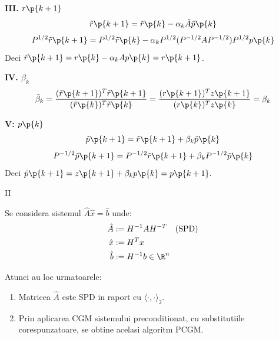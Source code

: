 \begin{demonstratie}
    \bigskip

    \textbf{III. $r\p{k + 1}$} \\
    $$ \tilde{r}\p{k+1} = \tilde{r}\p{k} - \alpha_k \tilde{A} \tilde{p}\p{k} $$
    $$ P^{1/2}\tilde{r}\p{k+1} = P^{1/2}\tilde{r}\p{k} - \alpha_k P^{1/2}(P^{-1/2} A P^{-1/2}) P^{1/2} p\p{k} $$
    Deci $ \tilde{r}\p{k+1} = r\p{k} - \alpha_k A p\p{k} = r\p{k + 1}$.

    \bigskip

    \textbf{IV. $\beta_k$} \\
    $$ \tilde{\beta}_k = \frac{(\tilde{r}\p{k+1})^T \tilde{r}\p{k+1}}{(\tilde{r}\p{k})^T \tilde{r}\p{k}} = \frac{(r\p{k+1})^T z\p{k+1}}{(r\p{k})^T z\p{k}} = \beta_k$$

    \textbf{V: $p\p{k}$} \\
    $$ \tilde{p}\p{k+1} = \tilde{r}\p{k+1} + \beta_k \tilde{p}\p{k} $$
    $$ P^{-1/2}\tilde{p}\p{k+1} = P^{-1/2}\tilde{r}\p{k+1} + \beta_k P^{-1/2}\tilde{p}\p{k} $$
    Deci $ \tilde{p}\p{k+1} = z\p{k+1} + \beta_k p\p{k} = p\p{k + 1}. $

\end{demonstratie}

\begin{observatie}{II}

    Se considera sistemul $ \hat{A} \hat{x} = \hat{b} $ unde:
    \begin{align*}
        \hat{A} &:= H^{-1} A H^{-T} \quad (\text{SPD}) \\
        \hat{x} &:= H^T x \\
        \hat{b} &:= H^{-1} b \in \R^n
    \end{align*}

    Atunci au loc urmatoarele:
    \begin{enumerate}
        \item[(1)] Matricea $\hat{A}$ este SPD in raport cu $\langle \cdot, \cdot \rangle_2$.
        \item[(2)] Prin aplicarea CGM sistemului preconditionat, cu substitutiile corespunzatoare, se obtine acelasi algoritm PCGM.
    \end{enumerate}

\end{observatie}

\newpage


